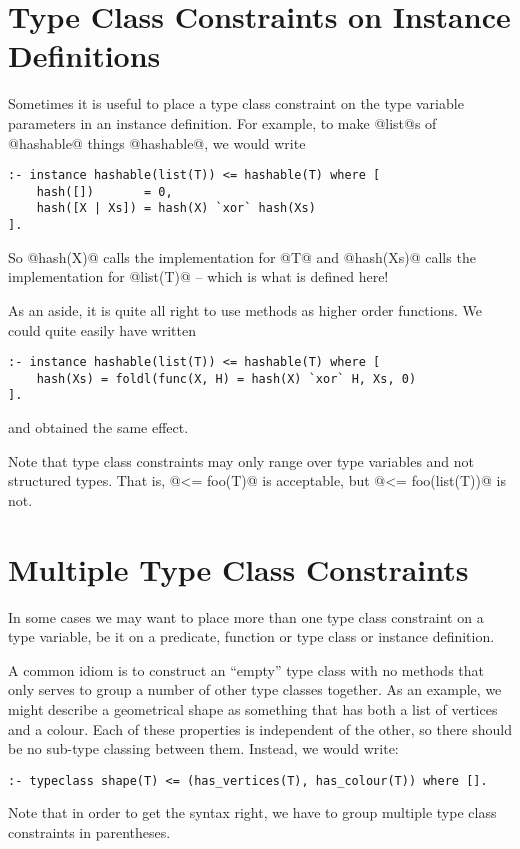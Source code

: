 \section{Type Class Constraints on Instance Definitions}

Sometimes it is useful to place a type class constraint on the type
variable parameters in an instance definition.  For example, to make
@list@s of @hashable@ things @hashable@, we would write
\begin{verbatim}
:- instance hashable(list(T)) <= hashable(T) where [
    hash([])       = 0,
    hash([X | Xs]) = hash(X) `xor` hash(Xs)
].
\end{verbatim}
So @hash(X)@ calls the implementation for @T@ and @hash(Xs)@ calls the
implementation for @list(T)@ -- which is what is defined here!

As an aside, it is quite all right to use methods as higher order
functions.  We could quite easily have written
\begin{verbatim}
:- instance hashable(list(T)) <= hashable(T) where [
    hash(Xs) = foldl(func(X, H) = hash(X) `xor` H, Xs, 0)
].
\end{verbatim}
and obtained the same effect.

Note that type class constraints may only range over type variables and
not structured types.  That is, @<= foo(T)@ is acceptable, but
@<= foo(list(T))@ is not.

\section{Multiple Type Class Constraints}

In some cases we may want to place more than one type class constraint
on a type variable, be it on a predicate, function or type class or
instance definition.

A common idiom is to construct an ``empty'' type class with no methods
that only serves to group a number of other type classes together.  As
an example, we might describe a geometrical shape as something that has
both a list of vertices and a colour.  Each of these properties is
independent of the other, so there should be no sub-type classing
between them.  Instead, we would write:
\begin{verbatim}
:- typeclass shape(T) <= (has_vertices(T), has_colour(T)) where [].
\end{verbatim}
Note that in order to get the syntax right, we have to group multiple
type class constraints in parentheses.

